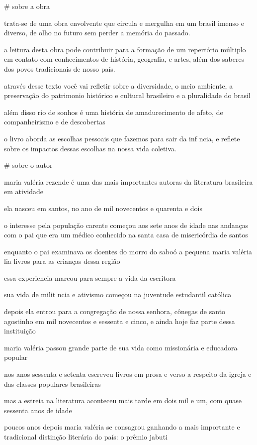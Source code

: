 # sobre a obra

trata-se de uma obra envolvente  que circula e mergulha em um brasil imenso  e diverso,  de olho no futuro  sem perder a memória do passado. 

a leitura desta obra  pode  contribuir para a formação de um repertório múltiplo   em contato com conhecimentos de história, geografia, e artes,  além dos saberes dos povos tradicionais de nosso país.

através desse texto  você vai refletir sobre a diversidade,  o meio ambiente,  a preservação do patrimonio histórico e cultural brasileiro  e a pluralidade do brasil 

além disso  rio de sonhos é uma história de amadurecimento  de afeto,  de companheirismo  e de descobertas   

o livro aborda as escolhas pessoais  que fazemos para sair da inf ncia,  e reflete sobre os impactos dessas escolhas na nossa vida coletiva.  

# sobre o autor

maria valéria rezende  é uma das mais importantes autoras da literatura brasileira  em atividade 

ela nasceu em santos,  no ano de mil novecentos e quarenta e dois 

o interesse pela população carente  começou aos sete anos de idade  nas andanças com o pai  que era um médico conhecido na santa casa de misericórdia de santos 

enquanto o pai examinava os doentes do morro do saboó  a pequena maria valéria lia livros para as crianças dessa região 

essa experiencia marcou para sempre a vida da escritora 

sua vida de milit ncia e ativismo  começou na juventude estudantil católica 

depois  ela entrou para a congregação de nossa senhora,  cônegas de santo agostinho  em mil novecentos e sessenta e cinco,   e ainda hoje faz parte dessa instituição 

maria valéria  passou grande parte de sua vida  como missionária e educadora popular 

nos anos sessenta e setenta  escreveu livros em prosa e verso  a respeito da igreja e das classes populares brasileiras  

mas a estreia na literatura aconteceu mais tarde  em dois mil e um,  com quase sessenta anos de idade  

poucos anos depois  maria valéria se consagrou  ganhando a mais importante e tradicional distinção literária do país:  o prêmio jabuti  

